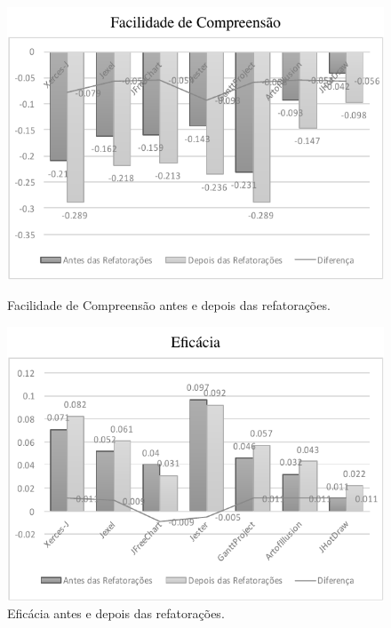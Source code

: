 \begin{figure}[!h]
\vspace*{0.5cm} %
\begin{minipage}[h]{0.5\textwidth}
\includegraphics[width=\linewidth]{images/GraficoBarraExperimentoFacilidadeDeCompreensaoNovo}
\caption{Facilidade de Compreensão antes e depois das refatorações.}
\label{fig:distal}
\end{minipage}
\hspace{\fill}
\begin{minipage}[h]{0.5\textwidth}
\includegraphics[width=\linewidth]{images/GraficoBarraExperimentoEficaciaNovo}
\caption{Eficácia antes e depois das refatorações.}
\label{fig:combined}
\end{minipage}

\end{figure}

